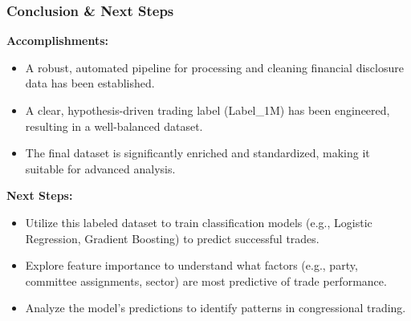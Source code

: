 \documentclass[aspectratio=169]{beamer}
\begin{document}
\begin{frame}
    \frametitle{Conclusion \& Next Steps}
    \textbf{Accomplishments:}
    \begin{itemize}
        \item A robust, automated pipeline for processing and cleaning financial disclosure data has been established.
        \item A clear, hypothesis-driven trading label (Label\_1M) has been engineered, resulting in a well-balanced dataset.
        \item The final dataset is significantly enriched and standardized, making it suitable for advanced analysis.
    \end{itemize}
    \vspace{1em}
    \textbf{Next Steps:}
    \begin{itemize}
        \item Utilize this labeled dataset to train classification models (e.g., Logistic Regression, Gradient Boosting) to predict successful trades.
        \item Explore feature importance to understand what factors (e.g., party, committee assignments, sector) are most predictive of trade performance.
        \item Analyze the model's predictions to identify patterns in congressional trading.
    \end{itemize}
\end{frame}
\end{document}
